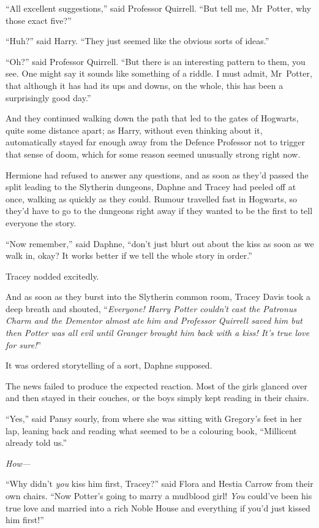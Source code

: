 “All excellent suggestions,” said Professor Quirrell.
“But tell me, Mr~Potter, why those exact five?”

“Huh?” said Harry.
“They just seemed like the obvious sorts of ideas.”

“Oh?” said Professor Quirrell.
“But there is an interesting pattern to them, you see. One might say it sounds like something of a riddle. I must admit, Mr~Potter, that although it has had its ups and downs, on the whole, this has been a surprisingly good day.”

And they continued walking down the path that led to the gates of Hogwarts, quite some distance apart; as Harry, without even thinking about it, automatically stayed far enough away from the Defence Professor not to trigger that sense of doom, which for some reason seemed unusually strong right now.


Hermione had refused to answer any questions, and as soon as they’d passed the split leading to the Slytherin dungeons, Daphne and Tracey had peeled off at once, walking as quickly as they could. Rumour travelled fast in Hogwarts, so they’d have to go to the dungeons right away if they wanted to be the first to tell everyone the story.

“Now remember,” said Daphne, “don’t just blurt out about the kiss as soon as we walk in, okay? It works better if we tell the whole story in order.”

Tracey nodded excitedly.

And as soon as they burst into the Slytherin common room, Tracey Davis took a deep breath and shouted, “\emph{Everyone! Harry Potter couldn’t cast the Patronus Charm and the Dementor almost ate him and Professor Quirrell saved him but then Potter was all evil until Granger brought him back with a kiss! It’s true love for sure!}”

It was ordered storytelling of a sort, Daphne supposed.

The news failed to produce the expected reaction. Most of the girls glanced over and then stayed in their couches, or the boys simply kept reading in their chairs.

“Yes,” said Pansy sourly, from where she was sitting with Gregory’s feet in her lap, leaning back and reading what seemed to be a colouring book,
“Millicent already told us.”

\emph{How—}

“Why didn’t \emph{you} kiss him first, Tracey?” said Flora and Hestia Carrow from their own chairs.
“Now Potter’s going to marry a mudblood girl! \emph{You} could’ve been his true love and married into a rich Noble House and everything if you’d just kissed him first!”

